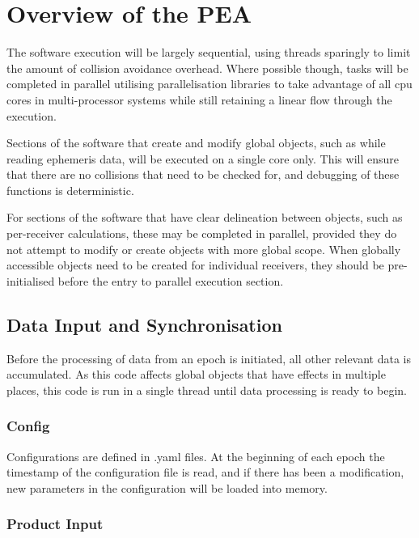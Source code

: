 \chapter{Overview of the PEA}


The software execution will be largely sequential, using threads sparingly to limit the amount of collision avoidance overhead. Where possible though, tasks will be completed in parallel utilising parallelisation libraries to take advantage of all cpu cores in multi-processor systems while still retaining a linear flow through the execution.

Sections of the software that create and modify global objects, such as while reading ephemeris data, will be executed on a single core only. This will ensure that there are no collisions that need to be checked for, and debugging of these functions is deterministic.

For sections of the software that have clear delineation between objects, such as per-receiver calculations, these may be completed in parallel, provided they do not attempt to modify or create objects with more global scope. When globally accessible objects need to be created for individual receivers, they should be pre-initialised before the entry to parallel execution section.


\section{Data Input and Synchronisation}

Before the processing of data from an epoch is initiated, all other relevant data is accumulated. As this code affects global objects that have effects in multiple places, this code is run in a single thread until data processing is ready to begin.


\subsection{Config}

Configurations are defined in .yaml files. At the beginning of each epoch the timestamp of the configuration file is read, and if there has been a modification, new parameters in the configuration will be loaded into memory.


\subsection{Product Input}

